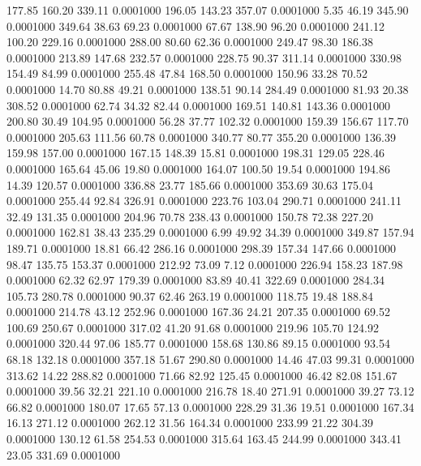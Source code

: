  177.85  160.20  339.11   0.0001000
 196.05  143.23  357.07   0.0001000
   5.35   46.19  345.90   0.0001000
 349.64   38.63   69.23   0.0001000
  67.67  138.90   96.20   0.0001000
 241.12  100.20  229.16   0.0001000
 288.00   80.60   62.36   0.0001000
 249.47   98.30  186.38   0.0001000
 213.89  147.68  232.57   0.0001000
 228.75   90.37  311.14   0.0001000
 330.98  154.49   84.99   0.0001000
 255.48   47.84  168.50   0.0001000
 150.96   33.28   70.52   0.0001000
  14.70   80.88   49.21   0.0001000
 138.51   90.14  284.49   0.0001000
  81.93   20.38  308.52   0.0001000
  62.74   34.32   82.44   0.0001000
 169.51  140.81  143.36   0.0001000
 200.80   30.49  104.95   0.0001000
  56.28   37.77  102.32   0.0001000
 159.39  156.67  117.70   0.0001000
 205.63  111.56   60.78   0.0001000
 340.77   80.77  355.20   0.0001000
 136.39  159.98  157.00   0.0001000
 167.15  148.39   15.81   0.0001000
 198.31  129.05  228.46   0.0001000
 165.64   45.06   19.80   0.0001000
 164.07  100.50   19.54   0.0001000
 194.86   14.39  120.57   0.0001000
 336.88   23.77  185.66   0.0001000
 353.69   30.63  175.04   0.0001000
 255.44   92.84  326.91   0.0001000
 223.76  103.04  290.71   0.0001000
 241.11   32.49  131.35   0.0001000
 204.96   70.78  238.43   0.0001000
 150.78   72.38  227.20   0.0001000
 162.81   38.43  235.29   0.0001000
   6.99   49.92   34.39   0.0001000
 349.87  157.94  189.71   0.0001000
  18.81   66.42  286.16   0.0001000
 298.39  157.34  147.66   0.0001000
  98.47  135.75  153.37   0.0001000
 212.92   73.09    7.12   0.0001000
 226.94  158.23  187.98   0.0001000
  62.32   62.97  179.39   0.0001000
  83.89   40.41  322.69   0.0001000
 284.34  105.73  280.78   0.0001000
  90.37   62.46  263.19   0.0001000
 118.75   19.48  188.84   0.0001000
 214.78   43.12  252.96   0.0001000
 167.36   24.21  207.35   0.0001000
  69.52  100.69  250.67   0.0001000
 317.02   41.20   91.68   0.0001000
 219.96  105.70  124.92   0.0001000
 320.44   97.06  185.77   0.0001000
 158.68  130.86   89.15   0.0001000
  93.54   68.18  132.18   0.0001000
 357.18   51.67  290.80   0.0001000
  14.46   47.03   99.31   0.0001000
 313.62   14.22  288.82   0.0001000
  71.66   82.92  125.45   0.0001000
  46.42   82.08  151.67   0.0001000
  39.56   32.21  221.10   0.0001000
 216.78   18.40  271.91   0.0001000
  39.27   73.12   66.82   0.0001000
 180.07   17.65   57.13   0.0001000
 228.29   31.36   19.51   0.0001000
 167.34   16.13  271.12   0.0001000
 262.12   31.56  164.34   0.0001000
 233.99   21.22  304.39   0.0001000
 130.12   61.58  254.53   0.0001000
 315.64  163.45  244.99   0.0001000
 343.41   23.05  331.69   0.0001000
